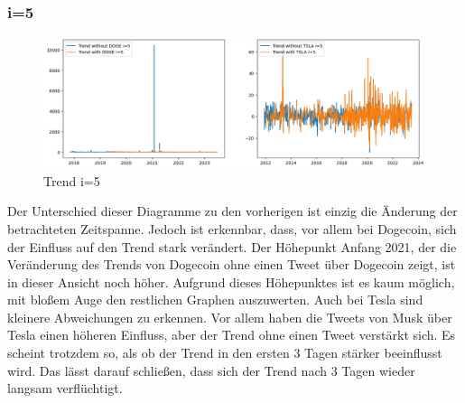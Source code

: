 \documentclass{article}
\begin{document}
\subsubsection{i=5} \label{i=5}
\begin{figure}[!htb]
  	\includegraphics[width=\textwidth, center]{../imgs/Trendi5.png}
 	\caption{Trend i=5}
 	\label{fig:Trendi5}
\end{figure}
Der Unterschied dieser Diagramme zu den vorherigen ist einzig die Änderung der betrachteten Zeitspanne.
Jedoch ist erkennbar, dass, vor allem bei Dogecoin, sich der Einfluss auf den Trend stark verändert.
Der Höhepunkt Anfang 2021, der die Veränderung des Trends von Dogecoin ohne einen Tweet über Dogecoin zeigt, ist in dieser Ansicht noch höher.
Aufgrund dieses Höhepunktes ist es kaum möglich, mit bloßem Auge den restlichen Graphen auszuwerten.
Auch bei Tesla sind kleinere Abweichungen zu erkennen.
Vor allem haben die Tweets von Musk über Tesla einen höheren Einfluss, aber der Trend ohne einen Tweet verstärkt sich.
Es scheint trotzdem so, als ob der Trend in den ersten 3 Tagen stärker beeinflusst wird. Das lässt darauf schließen, dass sich der Trend nach 3 Tagen wieder langsam verflüchtigt.
\end{document}
